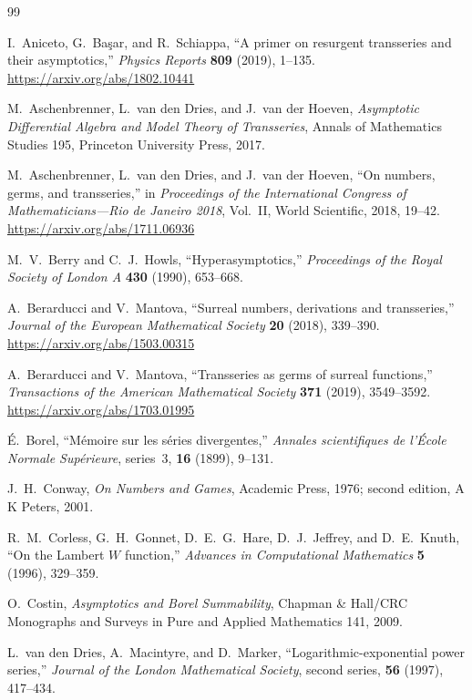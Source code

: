 \documentclass[11pt,openany]{book}
\theoremstyle{plain}
\theoremstyle{definition}
\theoremstyle{remark}
\begin{document}
\begin{thebibliography}{99}

I.~Aniceto, G.~Ba\c{s}ar, and R.~Schiappa,
``A primer on resurgent transseries and their asymptotics,''
\emph{Physics Reports} \textbf{809} (2019), 1--135.
\url{https://arxiv.org/abs/1802.10441}

M.~Aschenbrenner, L.~van den Dries, and J.~van der Hoeven,
\emph{Asymptotic Differential Algebra and Model Theory of Transseries},
Annals of Mathematics Studies 195, Princeton University Press, 2017.

M.~Aschenbrenner, L.~van den Dries, and J.~van der Hoeven,
``On numbers, germs, and transseries,''
in \emph{Proceedings of the International Congress of Mathematicians---Rio de Janeiro 2018}, Vol.~II, World Scientific, 2018, 19--42.
\url{https://arxiv.org/abs/1711.06936}

M.~V.~Berry and C.~J.~Howls,
``Hyperasymptotics,''
\emph{Proceedings of the Royal Society of London A} \textbf{430} (1990), 653--668.

A.~Berarducci and V.~Mantova,
``Surreal numbers, derivations and transseries,''
\emph{Journal of the European Mathematical Society} \textbf{20} (2018), 339--390.
\url{https://arxiv.org/abs/1503.00315}

A.~Berarducci and V.~Mantova,
``Transseries as germs of surreal functions,''
\emph{Transactions of the American Mathematical Society} \textbf{371} (2019), 3549--3592.
\url{https://arxiv.org/abs/1703.01995}

\'E.~Borel,
``M\'emoire sur les s\'eries divergentes,''
\emph{Annales scientifiques de l'\'Ecole Normale Sup\'erieure}, series~3, \textbf{16} (1899), 9--131.

J.~H.~Conway,
\emph{On Numbers and Games},
Academic Press, 1976; second edition, A K Peters, 2001.

R.~M.~Corless, G.~H.~Gonnet, D.~E.~G.~Hare, D.~J.~Jeffrey, and D.~E.~Knuth,
``On the Lambert $W$ function,''
\emph{Advances in Computational Mathematics} \textbf{5} (1996), 329--359.

O.~Costin,
\emph{Asymptotics and Borel Summability},
Chapman \& Hall/CRC Monographs and Surveys in Pure and Applied Mathematics 141, 2009.

L.~van den Dries, A.~Macintyre, and D.~Marker,
``Logarithmic-exponential power series,''
\emph{Journal of the London Mathematical Society}, second series, \textbf{56} (1997), 417--434.


\end{thebibliography}
\end{document}
